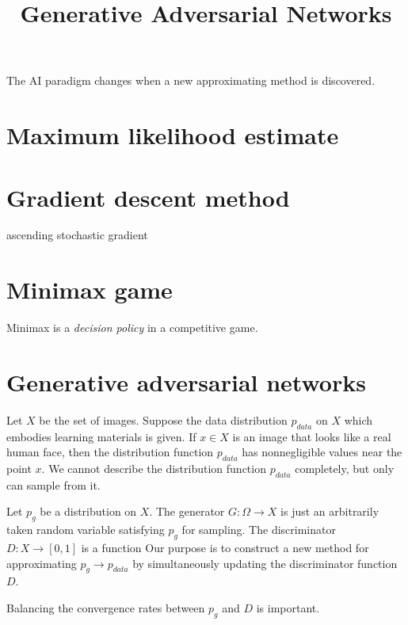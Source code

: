 \documentclass{../exp}
\title{Generative Adversarial Networks}
\begin{document}
The AI paradigm changes when a new approximating method is discovered.

\section{Maximum likelihood estimate}

\section{Gradient descent method}
ascending stochastic gradient


\section{Minimax game}

Minimax is a \emph{decision policy} in a competitive game.

\section{Generative adversarial networks}
Let $X$ be the set of images.
Suppose the data distribution $p_{data}$ on $X$ which embodies learning materials is given.
If $x\in X$ is an image that looks like a real human face, then the distribution function $p_{data}$ has nonnegligible values near the point $x$.
We cannot describe the distribution function $p_{data}$ completely, but only can sample from it.

Let $p_g$ be a distribution on $X$.
The generator $G:\Omega\to X$ is just an arbitrarily taken random variable satisfying $p_g$ for sampling.
The discriminator $D:X\to[0,1]$ is a function
Our purpose is to construct a new method for approximating $p_g\to p_{data}$ by simultaneously updating the discriminator function $D$.


Balancing the convergence rates between $p_g$ and $D$ is important.
\end{document}
